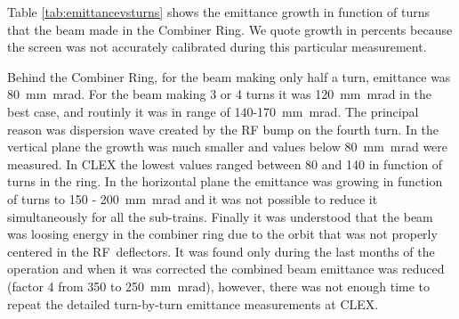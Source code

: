 
Table \ref{tab:emittancevsturns} shows the emittance growth in function of turns
that the beam made in the Combiner Ring. We quote growth in percents because 
the screen was not accurately calibrated during this particular measurement. 

Behind the Combiner Ring, for the beam making only half a turn, emittance was 80~mm~mrad.
For the beam making 3 or 4 turns it was 120~mm~mrad in the best case, 
and routinly it was in range of 140-170~mm~mrad. 
The principal reason was dispersion wave created by the RF bump on the fourth turn.
In the vertical plane the growth was much smaller and values below 80~mm~mrad were measured.
In CLEX the lowest values ranged between 80 and 140 in function of turns in the ring. 
In the horizontal plane the emittance was growing in function of turns to 150 - 200~mm~mrad
and it was not possible to reduce it simultaneously for all the sub-trains. 
Finally it was understood that the beam was loosing energy in the combiner ring
due to the orbit that was not properly centered in the RF~deflectors. 
It was found only during the last months of the operation and 
when it was corrected the combined beam emittance was reduced (factor 4 from 350 to 250~mm~mrad), 
however, there was not enough time to repeat the detailed turn-by-turn emittance measurements at CLEX.


